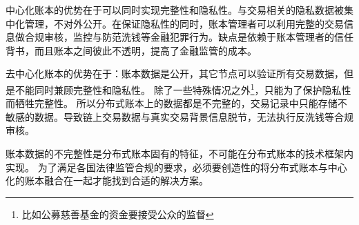 中心化账本的优势在于可以同时实现完整性和隐私性。与交易相关的隐私数据被集中化管理，不对外公开。在保证隐私性的同时，账本管理者可以利用完整的交易信息做合规审核，监控与防范洗钱等金融犯罪行为。缺点是依赖于账本管理者的信任背书，而且账本之间彼此不透明，提高了金融监管的成本。

去中心化账本的优势在于：账本数据是公开，其它节点可以验证所有交易数据，但是不能同时兼顾完整性和隐私性。
除了一些特殊情况之外\footnote{比如公募慈善基金的资金要接受公众的监督}，只能为了保护隐私性而牺牲完整性。
所以分布式账本上的数据都是不完整的，交易记录中只能存储不敏感的数据。导致链上交易数据与真实交易背景信息脱节，无法执行反洗钱等合规审核。

账本数据的不完整性是分布式账本固有的特征，不可能在分布式账本的技术框架内实现。
为了满足各国法律监管合规的要求，必须要创造性的将分布式账本与中心化的账本融合在一起才能找到合适的解决方案。

%
